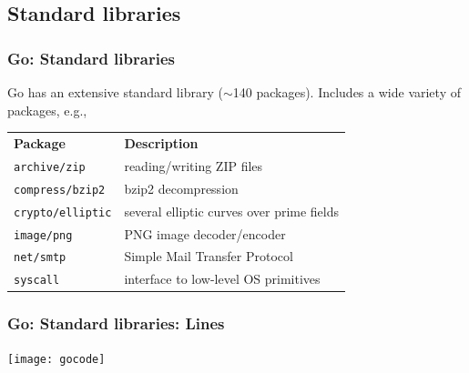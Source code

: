 \subsection{Standard libraries}

\begin{frame}[t]
  \frametitle{Go: Standard libraries}

  Go has an extensive standard library ($\sim$140 packages).
  Includes a wide variety of packages, e.g.,

  \vspace{\baselineskip}
  \begin{tabular}{ll}
    \bfseries{}Package  & \bfseries{}Description \\
    \texttt{archive/zip} & reading/writing ZIP files \\
    \texttt{compress/bzip2} & bzip2 decompression \\
    \texttt{crypto/elliptic} & several elliptic curves over prime fields \\
    \texttt{image/png} & PNG image decoder/encoder \\
    \texttt{net/smtp} & Simple Mail Transfer Protocol \\
    \texttt{syscall} & interface to low-level OS primitives \\
  \end{tabular}
\end{frame}

\begin{frame}[t]
  \frametitle{Go: Standard libraries: Lines}

  \texttt{[image: gocode]}

\end{frame}

